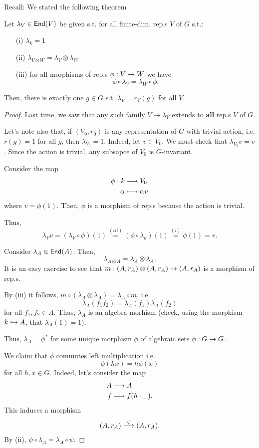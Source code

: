 Recall: We stated the following theorem
\begin{theorem}
	Let $\lambda_V \in  \textsf{End}(V)$ be given s.t. for all finite-dim. rep.s $V$ of $G$ s.t.:
	\begin{itemize}
		\item[(i)] $\lambda_k = 1$
		\item[(ii)] $\lambda_{V\otimes W} = \lambda_V \otimes \lambda_W$
		\item[(iii)] for all morphisms of rep.s $\phi :V \overset{}{\rightarrow} W$ we have
		\[ \phi \circ \lambda_V = \lambda_W \circ \phi. \]
	\end{itemize}
Then, there is exactly one $g \in G$ s.t. $\lambda_V = r_V(g)$ for all $V$.
\end{theorem}
\begin{proof}
	Last time, we saw that any such family $V \mapsto \lambda_V$ extends to \textbf{all} rep.s $V$ of $G$.
	
	Let's note also that, if $(V_0, r_0)$ is any representation of $G$ with trivial action, i.e. $r(g) = 1$ for all $g$, then $\lambda_{V_0} = 1$.
	Indeed, let $v\in V_0$. We must check that $\lambda_{V_0} v = v$. Since the action is trivial, any subsapce of $V_0$ is $G$-invariant.
	
	Consider the map
	\begin{align*}
	\phi : k& \overset{}{\longrightarrow} V_0\\
	\alpha & \longmapsto \alpha v
	\end{align*}
	where $v = \phi(1)$. Then, $\phi$ is a morphism of rep.s because the action is trivial.
	
	Thus,
	\[ \lambda_Vv = (\lambda_V \circ \phi)(1) \overset{(iii)}{=} (\phi \circ \lambda_k) (1) \overset{(i)}{=} \phi(1) = v. \]
	
	Consider $\lambda_A \in \textsf{End}(A)$. Then,
	\[ \lambda_{A\otimes A} = \lambda_A \otimes \lambda_A. \]
	It is an easy exercise to see that $m : (A, r_A) \otimes (A,r_A) \overset{}{\rightarrow} (A,r_A)$ is a morphism of rep.s.
	
	By (iii) it follows, $m \circ (\lambda_A\otimes \lambda_A) = \lambda_A \circ m$, i.e.
	\[ \lambda_A(f_1f_2) = \lambda_A(f_1) \lambda_A(f_2) \]
	for all $f_1, f_2 \in A$. Thus, $\lambda_A$ is an algebra morhism (check, using the morphism $k \overset{}{\hookrightarrow} A$, that $\lambda_A(1) = 1$).
	
	Thus, $\lambda_A = \phi^*$ for some unique morphism $\phi$ of algebraic sets $\phi : G \overset{}{\rightarrow} G$.
	
	We claim that $\phi$ commutes left multiplication i.e.
	\[ \phi(hx) = h \phi(x) \]
	for all $h,x \in G$. Indeed, let's consider the map
	\begin{align*}
	A & \overset{}{\longrightarrow} A\\
	f &\longmapsto f(h\cdot\_).
	\end{align*}
	This induces a morphism
	\begin{align*}
	(A, r_A) \overset{\psi}{\longrightarrow} (A,r_A).
	\end{align*}
	By (ii), $\psi \circ \lambda_A = \lambda_A \circ \psi$.
	

\end{proof}
